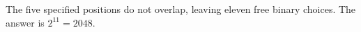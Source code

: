 The five specified positions do not overlap, leaving eleven free binary choices. The answer is $2^{11}=\boxed{2048}$.
